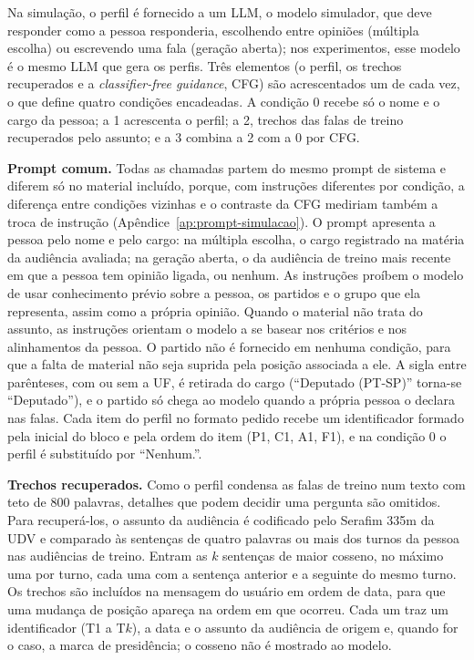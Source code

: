 Na simulação, o perfil é fornecido a um LLM, o modelo simulador, que deve responder como a pessoa
responderia, escolhendo entre opiniões (múltipla escolha) ou escrevendo uma fala (geração aberta); nos
experimentos, esse modelo é o mesmo LLM que gera os perfis. Três elementos (o perfil, os trechos
recuperados e a \textit{classifier-free guidance}, CFG) são acrescentados um de cada vez, o que define
quatro condições encadeadas. A condição 0 recebe só o nome e o cargo da pessoa; a 1 acrescenta o
perfil; a 2, trechos das falas de treino recuperados pelo assunto; e a 3 combina a 2 com a 0 por
CFG.

\textbf{Prompt comum.} Todas as chamadas partem do mesmo prompt de sistema e diferem só no material
incluído, porque, com instruções diferentes por condição, a diferença entre condições vizinhas e o
contraste da CFG mediriam também a troca de instrução (Apêndice~\ref{ap:prompt-simulacao}). O prompt
apresenta a pessoa pelo nome e pelo cargo: na múltipla escolha, o cargo registrado na matéria da
audiência avaliada; na geração aberta, o da audiência de treino mais recente em que a pessoa tem
opinião ligada, ou nenhum. As instruções proíbem o modelo de usar conhecimento prévio sobre a
pessoa, os partidos e o grupo que ela representa, assim como a própria opinião. Quando o material não
trata do assunto, as instruções orientam o modelo a se basear nos critérios e nos alinhamentos da
pessoa. O partido não é fornecido em nenhuma condição, para que a falta de material não seja suprida
pela posição associada a ele. A sigla entre parênteses, com ou sem a UF, é retirada do cargo
(``Deputado (PT-SP)'' torna-se ``Deputado''), e o partido só chega ao modelo quando a própria pessoa o
declara nas falas. Cada item do perfil no formato pedido recebe um identificador formado pela inicial do bloco e pela ordem do item (P1, C1, A1, F1), e na condição 0 o
perfil é substituído por ``Nenhum.''.

\textbf{Trechos recuperados.} Como o perfil condensa as falas de treino num texto com teto de 800
palavras, detalhes que podem decidir uma pergunta são omitidos. Para recuperá-los, o assunto da
audiência é codificado pelo Serafim 335m da UDV e comparado às sentenças de quatro palavras ou mais
dos turnos da pessoa nas audiências de treino. Entram as $k$ sentenças de maior cosseno, no máximo
uma por turno, cada uma com a sentença anterior e a seguinte do mesmo turno. Os trechos são incluídos
na mensagem do usuário em ordem de data, para que uma mudança de posição apareça na ordem em que
ocorreu. Cada um traz um identificador (T1 a T$k$), a data e o assunto da audiência de origem e,
quando for o caso, a marca de presidência; o cosseno não é mostrado ao modelo.

